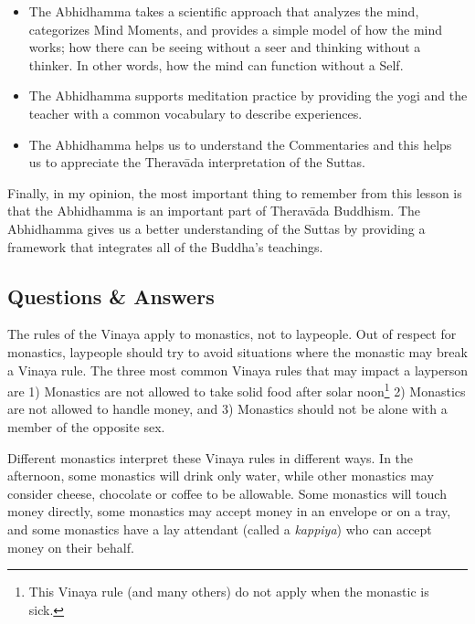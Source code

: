 \begin{itemize}
\item The Abhidhamma takes a scientific approach that analyzes the mind, categorizes Mind Moments, and provides a simple model of how the mind works; how there can be seeing without a seer and thinking without a thinker. In other words, how the mind can function without a Self.

\item The Abhidhamma supports meditation practice by providing the yogi and the teacher with a common vocabulary to describe experiences.

\item The Abhidhamma helps us to understand the Commentaries and this helps us to appreciate the Theravāda interpretation of the Suttas.

\end{itemize}

Finally, in my opinion, the most important thing to remember from this lesson is that the Abhidhamma is an important part of Theravāda Buddhism. The Abhidhamma gives us a better understanding of the Suttas by providing a framework that integrates all of the Buddha’s teachings.

\newpage

\subsection*{Questions \& Answers}


The rules of the Vinaya apply to monastics, not to laypeople. Out of respect for monastics, laypeople should try to avoid situations where the monastic may break a Vinaya rule. The three most common Vinaya rules that may impact a layperson are 1) Monastics are not allowed to take solid food after solar noon\footnote{This Vinaya rule (and many others) do not apply when the monastic is sick.} 2) Monastics are not allowed to handle money, and 3) Monastics should not be alone with a member of the opposite sex.

Different monastics interpret these Vinaya rules in different ways. In the afternoon, some monastics will drink only water, while other monastics may consider cheese, chocolate or coffee to be allowable. Some monastics will touch money directly, some monastics may accept money in an envelope or on a tray, and some monastics have a lay attendant (called a \textit{kappiya}) who can accept money on their behalf.

